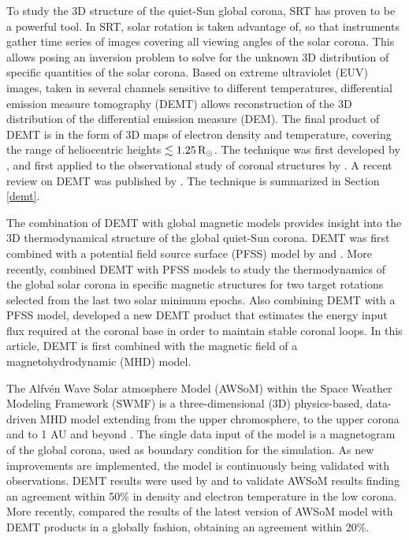 \documentclass[namedreferences]{solarphysics}
\newcommand{\mrsun}{{\rm R_\odot}}
\begin{document}
\begin{article}
To study the {3D structure of the quiet-Sun global corona,} SRT has proven to be a powerful tool. {In SRT, solar rotation is taken advantage of, so that instruments gather time series of images covering all viewing angles of the solar corona. This allows posing an inversion problem to solve for the unknown 3D distribution of specific quantities of the solar corona. Based on extreme ultraviolet (EUV) images, taken in several channels sensitive to different temperatures, differential emission measure tomography (DEMT) allows reconstruction of the 3D distribution of the differential emission measure (DEM). The final product of DEMT is in the form of 3D maps of electron density and temperature, covering the range of heliocentric heights $\lesssim 1.25\,\mrsun$.} The technique was first developed by \citet{frazin_2009}, and first applied to the observational study of coronal structures by \citet{vasquez_2009}. {A recent review on DEMT was published by \citet{vasquez_2016}. The technique is summarized in Section \ref{demt}.}

{The combination of DEMT with global magnetic models provides insight} into the 3D thermodynamical structure of the global quiet-Sun corona. {DEMT was first combined with a potential field source surface (PFSS) model by \citet{huang_2012} and \citet{nuevo_2013}. More recently,} \citet{lloveras_2017} combined DEMT with PFSS {models to study the thermodynamics of the global solar corona in specific magnetic structures for two target rotations selected from the last two solar minimum epochs. Also combining DEMT with a PFSS model,} \citet{maccormack_2017} developed a new DEMT product that estimates the energy input flux {required at the coronal base in order to maintain stable coronal loops}. In this article, {DEMT is first combined with the magnetic field of a magnetohydrodynamic (MHD) model.}

The Alfv\'{e}n Wave Solar atmosphere Model (AWSoM) within the Space {Weather} Modeling Framework (SWMF) is a three-dimensional (3D) physics-based, data-driven MHD model extending from the upper chromosphere, to the upper corona and to {1 AU and beyond} \citep{vander_2010, Van2014}. {The single data input of the model is a magnetogram of the global corona, used as boundary condition for the simulation. As new improvements are implemented, the model is continuously being validated with observations.} DEMT results were used by \citet{jin_2012} and \citet{oran_2015} to validate AWSoM results finding an agreement within 50\% in density and electron temperature in the low corona. More recently, \citet{sachdeva_2019} compared the results of the latest version of AWSoM model with DEMT products in a globally fashion, obtaining an agreement within 20\%. 


\end{article}
\end{document}
